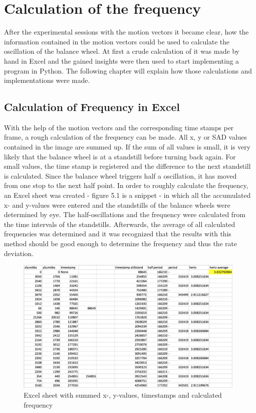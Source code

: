 \documentclass[12pt, a4paper]{report}
\begin{document}
    \chapter{Calculation of the frequency}
After the experimental sessions with the motion vectors it became clear, how the information contained in the motion vectors could be used to calculate the oscillation of the balance wheel. At first a crude calculation of it was made by hand in Excel and the gained insights were then used to start implementing a program in Python. The following chapter will explain how those calculations and implementations were made.
    
     \section{Calculation of Frequency in Excel}
    With the help of the motion vectors and the corresponding time stamps per frame, a rough calculation of the frequency can be made. All x, y or SAD values contained in the image are summed up. If the sum of all values is small, it is very likely that the balance wheel is at a standstill before turning back again. For small values, the time stamp is registered and the difference to the next standstill is calculated. Since the balance wheel triggers half a oscillation, it has moved from one stop to the next half point. 
    In order to roughly calculate the frequency, an Excel sheet was created - figure 5.1 is a snippet - in which all the accumulated x- and y-values were entered and the standstills of the balance wheels were determined by eye. The half-oscillations and the frequency were calculated from the time intervals of the standstills. Afterwards, the average of all calculated frequencies was determined and it was recognized that the results with this method should be good enough to determine the frequency and thus the rate deviation. 
    
    \noindent
    \begin{figure}[H]
    \centering
    \includegraphics[scale=0.45]{Images/excel_sheet_numbers.png}
    
    \caption{Excel sheet with summed x-, y-values, timestamps and calculated frequency}
    \end{figure}
    
\end{document}
